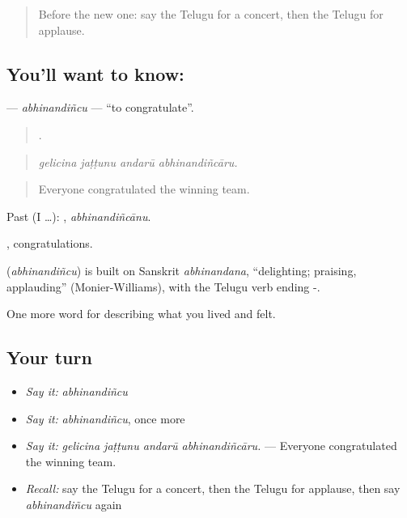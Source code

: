 \label{lesson:TE-C543-abhinandincu}



\begin{quote}
Before the new one: say the Telugu for a concert, then the Telugu for applause.
\end{quote}

\subsection*{You'll want to know: }
\textbf{} — \emph{abhinandiñcu} — \textquotedblleft{}to congratulate\textquotedblright{}.

\begin{quote}
   .
\end{quote}

\begin{quote}
\emph{gelicina jaṭṭunu andarū abhinandiñcāru.}
\end{quote}

\begin{quote}
Everyone congratulated the winning team.
\end{quote}

Past (I …): , \emph{abhinandiñcānu}.

, congratulations.

\begin{cousinweb}
\textbf{} (\emph{abhinandiñcu}) is built on Sanskrit \emph{abhinandana}, \textquotedblleft{}delighting; praising, applauding\textquotedblright{} (Monier-Williams), with the Telugu verb ending -.
\end{cousinweb}

\begin{grammarlens}[title={What you've built}]
One more word for describing what you lived and felt.
\end{grammarlens}

\subsection*{Your turn}
\begin{itemize}
\raggedright
  \item \emph{Say it:} \emph{abhinandiñcu}
  \item \emph{Say it:} \emph{abhinandiñcu}, once more
  \item \emph{Say it:} \emph{gelicina jaṭṭunu andarū abhinandiñcāru.} — Everyone congratulated the winning team.
  \item \emph{Recall:} say the Telugu for a concert, then the Telugu for applause, then say \emph{abhinandiñcu} again
\end{itemize}

